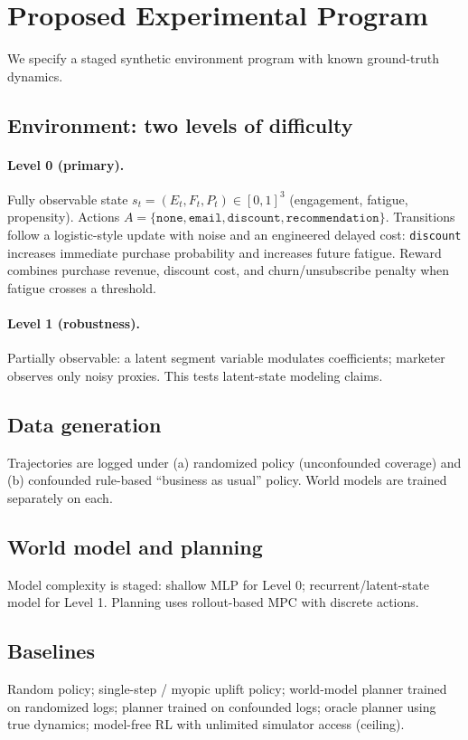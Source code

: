 \documentclass[11pt]{article}
\newcommand{\st}{s_t}
\begin{document}
\section{Proposed Experimental Program}
We specify a staged synthetic environment program with known ground-truth dynamics.

\subsection{Environment: two levels of difficulty}
\paragraph{Level 0 (primary).} Fully observable state $\st=(E_t,F_t,P_t)\in[0,1]^3$ (engagement, fatigue, propensity). Actions $A=\{\texttt{none},\texttt{email},\texttt{discount},\texttt{recommendation}\}$. Transitions follow a logistic-style update with noise and an engineered delayed cost: \texttt{discount} increases immediate purchase probability and increases future fatigue. Reward combines purchase revenue, discount cost, and churn/unsubscribe penalty when fatigue crosses a threshold.

\paragraph{Level 1 (robustness).} Partially observable: a latent segment variable modulates coefficients; marketer observes only noisy proxies. This tests latent-state modeling claims.

\subsection{Data generation}
Trajectories are logged under (a) randomized policy (unconfounded coverage) and (b) confounded rule-based ``business as usual'' policy. World models are trained separately on each.

\subsection{World model and planning}
Model complexity is staged: shallow MLP for Level 0; recurrent/latent-state model for Level 1. Planning uses rollout-based MPC with discrete actions.

\subsection{Baselines}
Random policy; single-step / myopic uplift policy; world-model planner trained on randomized logs; planner trained on confounded logs; oracle planner using true dynamics; model-free RL with unlimited simulator access (ceiling).
\end{document}
